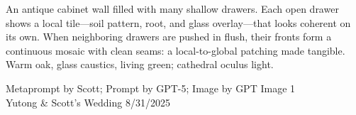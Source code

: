\documentclass[12pt]{article}
\begin{document}
\noindent
\begin{adjustbox}{max size={\textwidth}{\textheight}}
\begin{varwidth}{\textwidth}
\RaggedRight
\footnotesize
An antique cabinet wall filled with many shallow drawers. Each open drawer shows a local tile—soil pattern, root, and glass overlay—that looks coherent on its own. When neighboring drawers are pushed in flush, their fronts form a continuous mosaic with clean seams: a local-to-global patching made tangible. Warm oak, glass caustics, living green; cathedral oculus light.
\end{varwidth}
\end{adjustbox}
\vfill
{\raggedleft\footnotesize
Metaprompt by Scott; Prompt by GPT-5; Image by GPT Image 1 \\
Yutong \& Scott's Wedding 8/31/2025\par}
\end{document}
